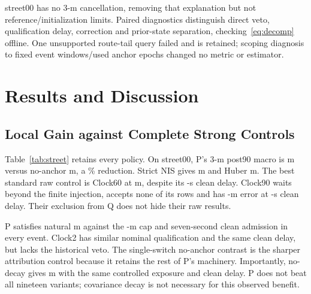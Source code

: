 \documentclass[conference]{IEEEtran}
\begin{document}
street00 has no 3-m cancellation, removing that explanation but not reference/initialization limits. Paired diagnostics distinguish direct veto, qualification delay, correction and prior-state separation, checking~\eqref{eq:decomp} offline. One unsupported route-tail query failed and is retained; scoping diagnosis to fixed event windows/used anchor epochs changed no metric or estimator.

\begin{table}[t]
\caption{Six routes, all already seen in this post-hoc analysis. 3-m post90 event-macro errors (m); P natural RMSE / inherited cap (m); maximum actual clean delay $T_c$ (s). Lower raw controls remain visible even outside Q.}\label{tab:routes}
\centering\small\setlength{\tabcolsep}{5pt}

\end{table}

\section{Results and Discussion}
\subsection{Local Gain against Complete Strong Controls}
Table~\ref{tab:street} retains every policy. On street00, P's 3-m post90 macro is  m versus no-anchor  m, a \% reduction. Strict NIS gives  m and Huber  m. The best standard raw control is Clock60 at  m, despite its -s clean delay. Clock90 waits beyond the finite injection, accepts none of its rows and has -m error at -s clean delay. Their exclusion from Q does not hide their raw results.

\begin{table}[t]
\caption{street00 controlled 3-m results, all 19 fixed policies. $R_{90}/R_{180}$: event-macro horizontal RMSE (m). $T_c$: maximum actual clean admission (s); C180 is censored. $n_b$: accepted injected rows out of 270. Q combines natural cost, clean service and coverage.}\label{tab:street}
\centering\small\setlength{\tabcolsep}{3pt}

\end{table}

P satisfies natural  m against the -m cap and seven-second clean admission in every event. Clock2 has similar nominal qualification and the same clean delay, but lacks the historical veto. The single-switch no-anchor contrast is the sharper attribution control because it retains the rest of P's machinery. Importantly, no-decay gives  m with the same controlled exposure and clean delay. P does not beat all nineteen variants; covariance decay is not necessary for this observed benefit.
\end{document}

